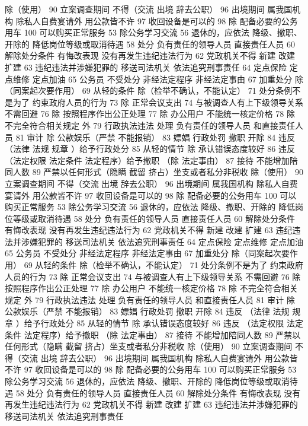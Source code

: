 \documentclass[cyan]{elegantnote}
\begin{document}
除（使用）
90 立案调查期间 不得（交流 出境 辞去公职）
96 出境期间 属我国机构 除私人自费宴请外 用公款皆不许
97 收回设备是可以的
98 除 配备必要的公务用车
100 可以购买正常服务
53 除公务学习交流
56 退休的，应依法
降级、撤职、开除的 降低岗位等级或取消待遇
58 处分
负有责任的领导人员
直接责任人员
60 解除处分条件
有悔改表现
没有再发生违纪违法行为
62 党政机关不得
新建 改建 扩建
63 违纪违法并涉嫌犯罪的
移送司法机关
依法追究刑事责任
64 定点保险 定点维修 定点加油
65 公务员 不受处分
非经法定程序
非经法定事由
67 加重处分
除（同案起次要作用）
69 从轻的条件
除（检举不确认，不能认定）
71 处分条例不是为了
约束政府人员的行为
73 除 正常会议支出
74 与被调查人有上下级领导关系 不需回避
76 除 按照程序作出公正处理
77 除 办公用户
不能统一核定价格
78 除 不完全符合相关规定 外
79 行政执法违法 处理
负有责任的领导人员
和直接责任人员
81 审计
除 公款娱乐（严禁 不能报销）
83 嫖娼 行政处罚
撤职 开除
84 违反 （法律 法规 规章 ）给予行政处分
85 从轻的情节
除 承认错误态度较好
86 违反 （法定权限 法定条件 法定程序）给予撤职
（除 法定事由）
87 接待 不能增加陪同人数
89 严禁以任何形式（隐瞒 截留 挤占）坐支或者私分非税收
除（使用）
90 立案调查期间 不得（交流 出境 辞去公职）
96 出境期间 属我国机构 除私人自费宴请外 用公款皆不许
97 收回设备是可以的
98 除 配备必要的公务用车
100 可以购买正常服务
53 除公务学习交流
56 退休的，应依法
降级、撤职、开除的 降低岗位等级或取消待遇
58 处分
负有责任的领导人员
直接责任人员
60 解除处分条件
有悔改表现
没有再发生违纪违法行为
62 党政机关不得
新建 改建 扩建
63 违纪违法并涉嫌犯罪的
移送司法机关
依法追究刑事责任
64 定点保险 定点维修 定点加油
65 公务员 不受处分
非经法定程序
非经法定事由
67 加重处分
除（同案起次要作用）
69 从轻的条件
除（检举不确认，不能认定）
71 处分条例不是为了
约束政府人员的行为
73 除 正常会议支出
74 与被调查人有上下级领导关系 不需回避
76 除 按照程序作出公正处理
77 除 办公用户
不能统一核定价格
78 除 不完全符合相关规定 外
79 行政执法违法 处理
负有责任的领导人员
和直接责任人员
81 审计
除 公款娱乐（严禁 不能报销）
83 嫖娼 行政处罚
撤职 开除
84 违反 （法律 法规 规章 ）给予行政处分
85 从轻的情节
除 承认错误态度较好
86 违反 （法定权限 法定条件 法定程序）给予撤职
（除 法定事由）
87 接待 不能增加陪同人数
89 严禁以任何形式（隐瞒 截留 挤占）坐支或者私分非税收
除（使用）
90 立案调查期间 不得（交流 出境 辞去公职）
96 出境期间 属我国机构 除私人自费宴请外 用公款皆不许
97 收回设备是可以的
98 除 配备必要的公务用车
100 可以购买正常服务
53 除公务学习交流
56 退休的，应依法
降级、撤职、开除的 降低岗位等级或取消待遇
58 处分
负有责任的领导人员
直接责任人员
60 解除处分条件
有悔改表现
没有再发生违纪违法行为
62 党政机关不得
新建 改建 扩建
63 违纪违法并涉嫌犯罪的
移送司法机关
依法追究刑事责任
\end{document}
